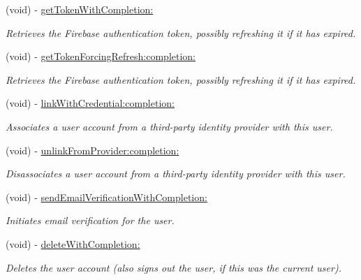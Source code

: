 \begin{DoxyCompactItemize}
(void) -\/ \hyperlink{interface_f_i_r_user_af3f89404858e45b357e9075721c38cd5}{get\+Token\+With\+Completion\+:}
\begin{DoxyCompactList}\small\item\em Retrieves the Firebase authentication token, possibly refreshing it if it has expired. \end{DoxyCompactList}\item 
(void) -\/ \hyperlink{interface_f_i_r_user_a792252ddc28e821bc042f1eeea3de332}{get\+Token\+Forcing\+Refresh\+:completion\+:}
\begin{DoxyCompactList}\small\item\em Retrieves the Firebase authentication token, possibly refreshing it if it has expired. \end{DoxyCompactList}\item 
(void) -\/ \hyperlink{interface_f_i_r_user_a604393cf7db6df9d8a47407195fee8bb}{link\+With\+Credential\+:completion\+:}
\begin{DoxyCompactList}\small\item\em Associates a user account from a third-\/party identity provider with this user. \end{DoxyCompactList}\item 
(void) -\/ \hyperlink{interface_f_i_r_user_a769797ae2a590332fcb2a69037ba521e}{unlink\+From\+Provider\+:completion\+:}
\begin{DoxyCompactList}\small\item\em Disassociates a user account from a third-\/party identity provider with this user. \end{DoxyCompactList}\item 
(void) -\/ \hyperlink{interface_f_i_r_user_a95daab86e5a82885d95a3a27ddac81fb}{send\+Email\+Verification\+With\+Completion\+:}
\begin{DoxyCompactList}\small\item\em Initiates email verification for the user. \end{DoxyCompactList}\item 
(void) -\/ \hyperlink{interface_f_i_r_user_a07c341d7bde3a87e50a2181ac77758ac}{delete\+With\+Completion\+:}
\begin{DoxyCompactList}\small\item\em Deletes the user account (also signs out the user, if this was the current user). \end{DoxyCompactList}\end{DoxyCompactItemize}
